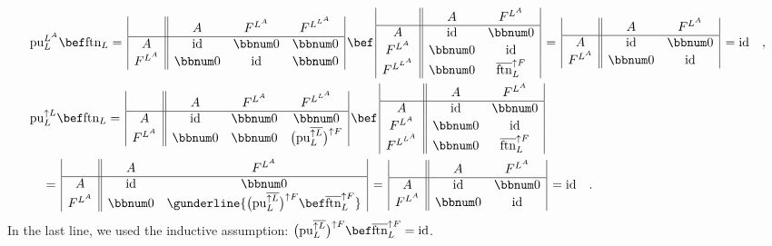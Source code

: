 \begin{align*}
 & \text{pu}_{L}^{L^{A}}\bef\text{ftn}_{L}=\,\begin{array}{|c||ccc|}
 & A & F^{L^{A}} & F^{L^{L^{A}}}\\
\hline A & \text{id} & \bbnum 0 & \bbnum 0\\
F^{L^{A}} & \bbnum 0 & \text{id} & \bbnum 0
\end{array}\,\bef\,\begin{array}{|c||cc|}
 & A & F^{L^{A}}\\
\hline A & \text{id} & \bbnum 0\\
F^{L^{A}} & \bbnum 0 & \text{id}\\
F^{L^{L^{A}}} & \bbnum 0 & \overline{\text{ftn}}_{L}^{\uparrow F}
\end{array}\,=\,\begin{array}{|c||cc|}
 & A & F^{L^{A}}\\
\hline A & \text{id} & \bbnum 0\\
F^{L^{A}} & \bbnum 0 & \text{id}
\end{array}\,=\text{id}\quad,\\
 & \text{pu}_{L}^{\uparrow L}\bef\text{ftn}_{L}=\,\begin{array}{|c||ccc|}
 & A & F^{L^{A}} & F^{L^{L^{A}}}\\
\hline A & \text{id} & \bbnum 0 & \bbnum 0\\
F^{L^{A}} & \bbnum 0 & \bbnum 0 & \big(\text{pu}_{L}^{\overline{\uparrow L}}\big)^{\uparrow F}
\end{array}\,\bef\,\begin{array}{|c||cc|}
 & A & F^{L^{A}}\\
\hline A & \text{id} & \bbnum 0\\
F^{L^{A}} & \bbnum 0 & \text{id}\\
F^{L^{L^{A}}} & \bbnum 0 & \overline{\text{ftn}}_{L}^{\uparrow F}
\end{array}\\
 & \quad=\,\begin{array}{|c||cc|}
 & A & F^{L^{A}}\\
\hline A & \text{id} & \bbnum 0\\
F^{L^{A}} & \bbnum 0 & \gunderline{\big(\text{pu}_{L}^{\overline{\uparrow L}}\big)^{\uparrow F}\bef\overline{\text{ftn}}_{L}^{\uparrow F}}
\end{array}\,=\,\begin{array}{|c||cc|}
 & A & F^{L^{A}}\\
\hline A & \text{id} & \bbnum 0\\
F^{L^{A}} & \bbnum 0 & \text{id}
\end{array}\,=\text{id}\quad.
\end{align*}
In the last line, we used the inductive assumption: $\big(\text{pu}_{L}^{\overline{\uparrow L}}\big)^{\uparrow F}\bef\overline{\text{ftn}}_{L}^{\uparrow F}=\text{id}$.


